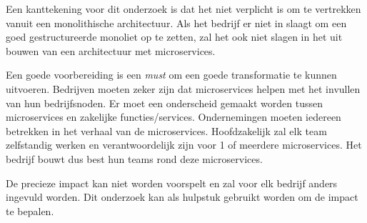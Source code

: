 Een kanttekening voor dit onderzoek is dat het niet verplicht is om te vertrekken vanuit een monolithische architectuur. Als het bedrijf er niet in slaagt om een goed gestructureerde monoliet op te zetten, zal het ook niet slagen in het uit bouwen van een architectuur met microservices.  ~\autocite{Tilkov2015}

Een goede voorbereiding is een \emph{must} om een goede transformatie te kunnen uitvoeren. Bedrijven moeten zeker zijn dat microservices helpen met het invullen van hun bedrijfsnoden. Er moet een onderscheid gemaakt worden tussen microservices en zakelijke functies/services. Ondernemingen moeten iedereen betrekken in het verhaal van de microservices. Hoofdzakelijk zal elk team zelfstandig werken en verantwoordelijk zijn voor 1 of meerdere microservices. Het bedrijf bouwt dus best hun teams rond deze microservices. 

De precieze impact kan niet worden voorspelt en zal voor elk bedrijf anders ingevuld worden. Dit onderzoek kan als hulpstuk gebruikt worden om de impact te bepalen.





 
